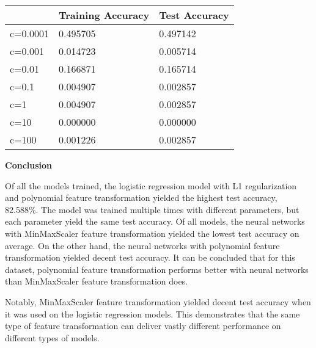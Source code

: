 \documentclass[12pt]{article}
\begin{document}
\begin{enumerate}
\begin{enumerate}
		\begin{center}
			\begin{tabular}{|l|l|l|}
				\hline
				& Training Accuracy & Test Accuracy \\ \hline
				c=0.0001 & 0.495705           & 0.497142       \\ \hline
				c=0.001  & 0.014723            & 0.005714        \\ \hline
				c=0.01   & 0.166871           & 0.165714       \\ \hline
				c=0.1    & 0.004907            & 0.002857        \\ \hline
				c=1      & 0.004907            & 0.002857        \\ \hline
				c=10     & 0.000000          & 0.000000      \\ \hline
				c=100    & 0.001226            & 0.002857        \\ \hline
			\end{tabular}
		\end{center}
	\end{enumerate}
	\end{enumerate}
	
	\pagebreak
	
	\textbf{Conclusion}
	
	Of all the models trained, the logistic regression model with L1 regularization and polynomial feature transformation yielded the highest test accuracy, 82.588\%. The model was trained multiple times with different parameters, but each parameter yield the same test accuracy. Of all models, the neural networks with MinMaxScaler feature transformation yielded the lowest test accuracy on average. On the other hand, the neural networks with polynomial feature transformation yielded decent test accuracy. It can be concluded that for this dataset, polynomial feature transformation performs better with neural networks than MinMaxScaler feature transformation does.
	
	Notably, MinMaxScaler feature transformation yielded decent test accuracy when it was used on the logistic regression models. This demonstrates that the same type of feature transformation can deliver vastly different performance on different types of models.
\end{document}

